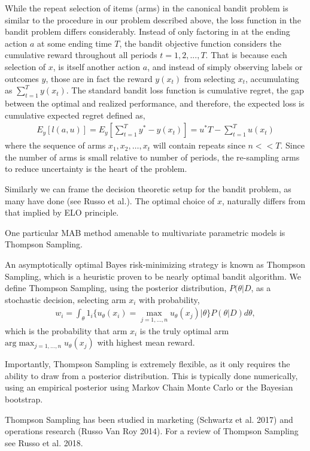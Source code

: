 \documentclass[a4paper,12pt]{article}
\begin{document}
While the repeat selection of items (arms) in the canonical bandit problem is similar to the procedure in our problem described above, the loss function in the bandit problem differs considerably. Instead of only factoring in at the ending action $a$ at some ending time $T$, the bandit objective function considers the cumulative reward throughout all periods $t=1,2,...,T$. That is because each selection of $x$, is itself another action $a$, and instead of simply observing labels or outcomes $y$, those are in fact the reward $y(x_t)$ from selecting $x_t$, accumulating as $\sum_{t=1}^{T} y(x_t)$. The standard bandit loss function is cumulative regret, the gap between the optimal and realized performance, and therefore, the expected loss is cumulative expected regret defined as,
\begin{align}
E_y[ l(a,u) ] = E_y[ \sum_{t=1}^{T} y^{*} - y(x_t) ] 
= u^{*}T - \sum_{t=1}^{T} u(x_t) 
\end{align}
where the sequence of arms $x_1,x_2,\ldots,x_t$ will contain repeats since $n << T$. Since the number of arms is small relative to number of periods, the re-sampling arms to reduce uncertainty is the heart of the problem. 

Similarly we can frame the decision theoretic setup for the bandit problem, as many have done (see Russo et al.). The optimal choice of $x$, naturally differs from that implied by ELO principle. 

One particular MAB method amenable to multivariate parametric models is Thompson Sampling.


An asymptotically optimal Bayes risk-minimizing strategy is known as Thompson Sampling, which is a heuristic proven to be nearly optimal bandit algorithm. We define Thompson Sampling, using the posterior distribution, $P(\theta|D$, as a stochastic decision, selecting arm $x_i$ with probability,
\begin{align} 
w_i = \int_\theta 1_i\{ u_\theta(x_i) = \max_{j=1,\ldots,n} u_\theta(x_j) | \theta \} P(\theta|D)d\theta ,
\end{align}
which is the probability that arm $x_i$ is the truly optimal arm $\text{arg}\max_{j=1,\ldots,n} u_\theta(x_j)$ with highest mean reward. 

Importantly, Thompson Sampling is extremely flexible, as it only requires the ability to draw from a posterior distribution. This is typically done numerically, using an empirical posterior using Markov Chain Monte Carlo or the Bayesian bootstrap.

Thompson Sampling has been studied in marketing (Schwartz et al. 2017) and operations research (Russo Van Roy 2014). For a review of Thompson Sampling see Russo et al. 2018. 
\end{document}
